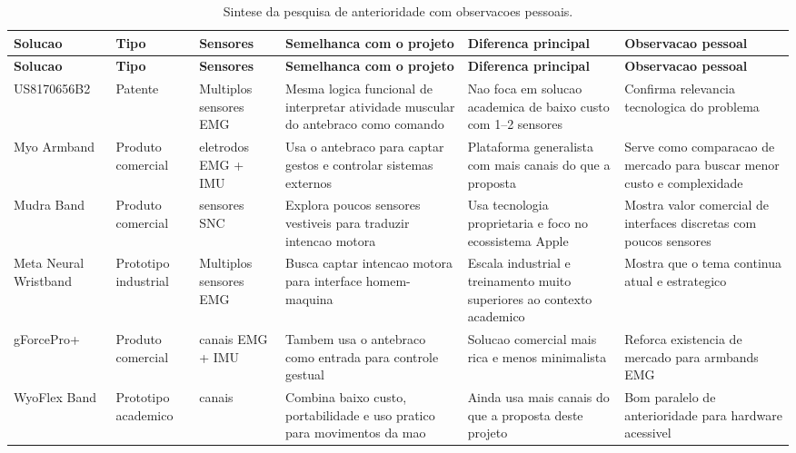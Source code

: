 \documentclass[12pt,oneside,a4paper,english,brazilian]{abntex2}
\begin{document}
\small
\setlength{\tabcolsep}{4pt}
\begin{longtable}{@{}>{\RaggedRight\arraybackslash}p{}>{\RaggedRight\arraybackslash}p{}>{\RaggedRight\arraybackslash}p{}>{\RaggedRight\arraybackslash}p{}>{\RaggedRight\arraybackslash}p{}>{\RaggedRight\arraybackslash}p{}@{}}
\caption{Sintese da pesquisa de anterioridade com observacoes pessoais.}\label{tab:anterioridade}\\
\toprule
\textbf{Solucao} & \textbf{Tipo} & \textbf{Sensores} & \textbf{Semelhanca com o projeto} & \textbf{Diferenca principal} & \textbf{Observacao pessoal} \\
\midrule
\endfirsthead

\toprule
\textbf{Solucao} & \textbf{Tipo} & \textbf{Sensores} & \textbf{Semelhanca com o projeto} & \textbf{Diferenca principal} & \textbf{Observacao pessoal} \\
\midrule
\endhead

\midrule
\endfoot

\bottomrule
\endlastfoot

US8170656B2 & Patente & Multiplos sensores EMG & Mesma logica funcional de interpretar atividade muscular do antebraco como comando & Nao foca em solucao academica de baixo custo com 1--2 sensores & Confirma relevancia tecnologica do problema \\
\midrule
Myo Armband & Produto comercial & 8 eletrodos EMG + IMU & Usa o antebraco para captar gestos e controlar sistemas externos & Plataforma generalista com mais canais do que a proposta & Serve como comparacao de mercado para buscar menor custo e complexidade \\
\midrule
Mudra Band & Produto comercial & 3 sensores SNC & Explora poucos sensores vestiveis para traduzir intencao motora & Usa tecnologia proprietaria e foco no ecossistema Apple & Mostra valor comercial de interfaces discretas com poucos sensores \\
\midrule
Meta Neural Wristband & Prototipo industrial & Multiplos sensores EMG & Busca captar intencao motora para interface homem-maquina & Escala industrial e treinamento muito superiores ao contexto academico & Mostra que o tema continua atual e estrategico \\
\midrule
gForcePro+ & Produto comercial & 8 canais EMG + IMU & Tambem usa o antebraco como entrada para controle gestual & Solucao comercial mais rica e menos minimalista & Reforca existencia de mercado para armbands EMG \\
\midrule
WyoFlex Band & Prototipo academico & 4 canais & Combina baixo custo, portabilidade e uso pratico para movimentos da mao & Ainda usa mais canais do que a proposta deste projeto & Bom paralelo de anterioridade para hardware acessivel \\
\end{longtable}
\normalsize
\end{document}
